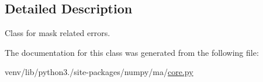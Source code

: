 \subsection{Detailed Description}
\begin{DoxyVerb}Class for mask related errors.\end{DoxyVerb}
 

The documentation for this class was generated from the following file\+:\begin{DoxyCompactItemize}
\item 
venv/lib/python3./site-\/packages/numpy/ma/\hyperlink{numpy_2ma_2core_8py}{core.\+py}\end{DoxyCompactItemize}
